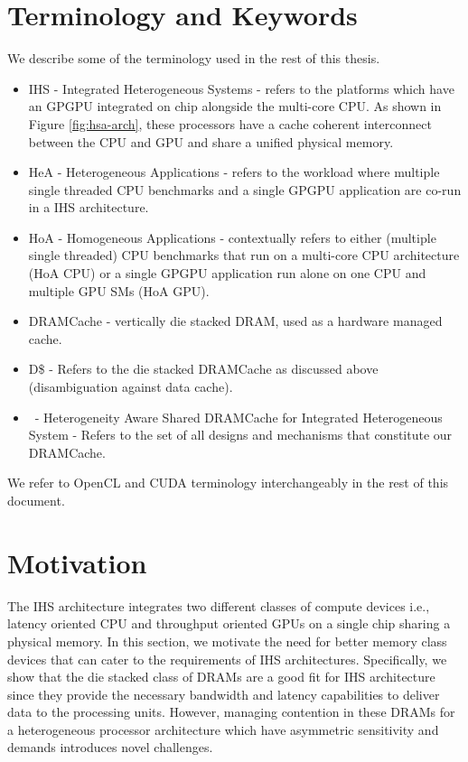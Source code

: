 \section{Terminology and Keywords}
We describe some of the terminology used in the rest of this thesis.
\begin{itemize}
	\item IHS - Integrated Heterogeneous Systems - refers to the platforms which have an GPGPU integrated on chip alongside the multi-core CPU. As shown in Figure \ref{fig:hsa-arch}, these processors have a cache coherent interconnect between the CPU and GPU and share a unified physical memory.
	\item HeA - Heterogeneous Applications - refers to the workload where multiple single threaded CPU benchmarks and a single GPGPU application are co-run in a IHS architecture.
	\item HoA - Homogeneous Applications - contextually refers to either (multiple single threaded) CPU benchmarks that run on a multi-core CPU architecture (HoA CPU) or a single GPGPU application run alone on one CPU and multiple GPU SMs (HoA GPU).
	\item DRAMCache - vertically die stacked DRAM, used as a hardware managed cache.
	\item D\$ - Refers to the die stacked DRAMCache as discussed above (disambiguation against data cache).
	\item \cachename\ - Heterogeneity Aware Shared DRAMCache for Integrated Heterogeneous System - Refers to the set of all designs and mechanisms that constitute our DRAMCache.
\end{itemize}
We refer to OpenCL \cite{opencl} and CUDA \cite{cuda} terminology interchangeably in the rest of this document.



\section{Motivation} \label{motivation}
The IHS architecture integrates two different classes of compute devices i.e., latency oriented CPU and throughput oriented GPUs on a single chip sharing a physical memory. In this section, we motivate the need for better memory class devices that can cater to the requirements of IHS architectures. Specifically, we show that the die stacked class of DRAMs are a good fit for IHS architecture since they provide the necessary bandwidth and latency capabilities to deliver data to the processing units. However, managing contention in these DRAMs for a heterogeneous processor architecture which have asymmetric sensitivity and demands introduces novel challenges.

